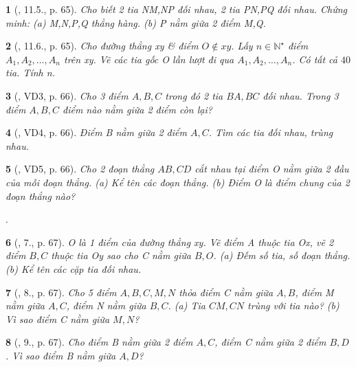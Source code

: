 \documentclass{article}
\newtheorem{baitoan}{}
\begin{document}
\begin{baitoan}[\cite{Binh_boi_duong_Toan_6_tap_2}, 11.5., p. 65]
	Cho biết 2 tia NM,NP đối nhau, 2 tia PN,PQ đối nhau. Chứng minh: (a) M,N,P,Q thẳng hàng. (b) P nằm giữa 2 điểm M,Q.
\end{baitoan}

\begin{baitoan}[\cite{Binh_boi_duong_Toan_6_tap_2}, 11.6., p. 65]
	Cho đường thẳng xy \& điểm $O\notin xy$. Lấy $n\in\mathbb{N}^\star$ điểm $A_1,A_2,\ldots,A_n$ trên xy. Vẽ các tia gốc O lần lượt đi qua $A_1,A_2,\ldots,A_n$. Có tất cả $40$ tia. Tính n.
\end{baitoan}

\begin{baitoan}[\cite{Binh_Toan_6_tap_2}, VD3, p. 66]
	Cho 3 điểm $A,B,C$ trong đó 2 tia $BA,BC$ đối nhau. Trong 3 điểm $A,B,C$ điểm nào nằm giữa 2 điểm còn lại?
\end{baitoan}

\begin{baitoan}[\cite{Binh_Toan_6_tap_2}, VD4, p. 66]
	Điểm B nằm giữa 2 điểm $A,C$. Tìm các tia đối nhau, trùng nhau.
\end{baitoan}

\begin{baitoan}[\cite{Binh_Toan_6_tap_2}, VD5, p. 66]
	Cho 2 đoạn thẳng $AB,CD$ cắt nhau tại điểm O nằm giữa 2 đầu của mỗi đoạn thẳng. (a) Kể tên các đoạn thẳng. (b) Điểm O là điểm chung của 2 đoạn thẳng nào?
\end{baitoan}
\noindent\cite[VD6, p. 66, 14., p. 68]{Binh_Toan_6_tap_2}.

\begin{baitoan}[\cite{Binh_Toan_6_tap_2}, 7., p. 67]
	O là 1 điểm của đường thẳng xy. Vẽ điểm A thuộc tia Ox, vẽ 2 điểm $B,C$ thuộc tia Oy sao cho C nằm giữa $B,O$. (a) Đếm số tia, số đoạn thẳng. (b) Kể tên các cặp tia đối nhau.
\end{baitoan}

\begin{baitoan}[\cite{Binh_Toan_6_tap_2}, 8., p. 67]
	Cho 5 điểm $A,B,C,M,N$ thỏa điểm C nằm giữa $A,B$, điểm M nằm giữa $A,C$, điểm N nằm giữa $B,C$. (a) Tia $CM,CN$ trùng với tia nào? (b) Vì sao điểm C nằm giữa $M,N$?
\end{baitoan}

\begin{baitoan}[\cite{Binh_Toan_6_tap_2}, 9., p. 67]
	Cho điểm B nằm giữa 2 điểm $A,C$, điểm C nằm giữa 2 điểm $B,D$. Vì sao điểm B nằm giữa $A,D$?
\end{baitoan}
\end{document}
